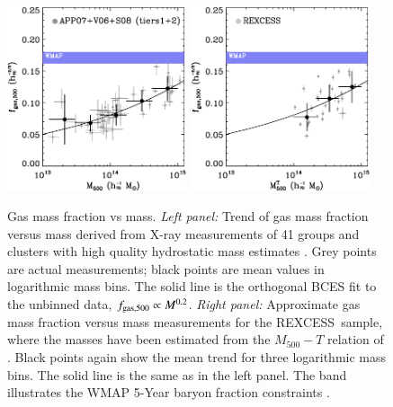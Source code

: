 \documentclass[oldversion]{aa}
\newcommand{\rexcess}{{\gwpfont REXCESS}}
\begin{document}
\begin{figure}[]
\centering
\includegraphics[width=0.47\textwidth]{0944f8a.eps}
\hfill
\includegraphics[width=0.47\textwidth]{0944f8b.eps}

\caption{{\footnotesize Gas mass fraction vs mass. {\it Left panel\/:} Trend of gas mass fraction versus mass derived from X-ray measurements of 41 groups and clusters with high quality hydrostatic mass estimates \citep{app07,vikh06,sun08}. Grey points are actual measurements; black points are mean values in logarithmic mass bins. The solid line is the orthogonal BCES fit to the unbinned data, $f_{\rm gas,500} \propto M^{0.2}$. {\it Right panel\/:} Approximate gas mass fraction versus mass measurements for the \rexcess\
    sample, where the masses have been estimated from the $M_{500}-T$ relation of
    \citet{app05}. Black points again show the mean trend for three logarithmic mass bins. The solid line is the same as in the left panel. The band illustrates the WMAP 5-Year baryon fraction constraints \citep{dunk09}.}}\label{fig:fgas} 
   \end{figure}
\end{document}
